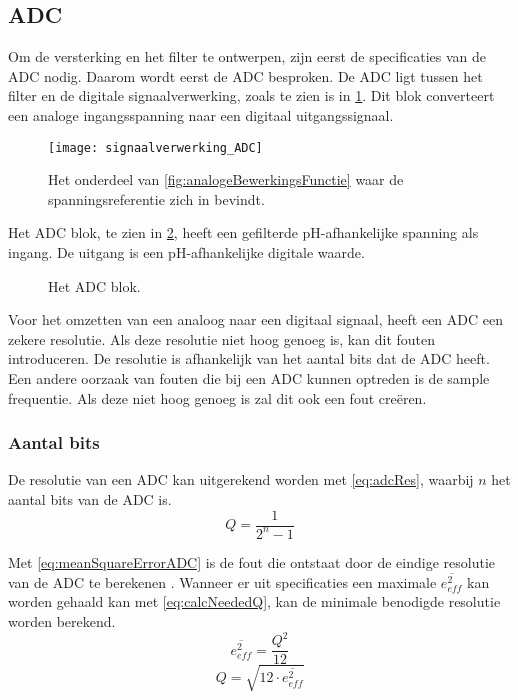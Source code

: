 \subsection{ADC}
Om de versterking en het filter te ontwerpen, zijn eerst de specificaties van de ADC nodig. Daarom wordt eerst de ADC besproken. De ADC ligt tussen het filter en de digitale signaalverwerking, zoals te zien is in \cref{fig:ADCInSchema}. Dit blok converteert een analoge ingangsspanning naar een digitaal uitgangssignaal.

\begin{figure}[!htb]
    \centering
    \texttt{[image: signaalverwerking\_ADC]}
    \caption{Het onderdeel van \cref{fig:analogeBewerkingsFunctie} waar de spanningsreferentie zich in bevindt.}
    \label{fig:ADCInSchema}
\end{figure}

Het ADC blok, te zien in \cref{fig:ADCBlok}, heeft een gefilterde pH-afhankelijke spanning als ingang. De uitgang is een pH-afhankelijke digitale waarde.

\begin{figure}[!htb]
    \centering
    \def\svgwidth{0.4\textwidth}
    
    \caption{Het ADC blok.}
    \label{fig:ADCBlok}
\end{figure}

Voor het omzetten van een analoog naar een digitaal signaal, heeft een ADC een zekere resolutie. Als deze resolutie niet hoog genoeg is, kan dit fouten introduceren. De resolutie is afhankelijk van het aantal bits dat de ADC heeft. Een andere oorzaak van fouten die bij een ADC kunnen optreden is de sample frequentie. Als deze niet hoog genoeg is zal dit ook een fout creëren.

\subsubsection{Aantal bits} \label{sec:ADC:numBits}
De resolutie van een ADC kan uitgerekend worden met \cref{eq:adcRes}, waarbij $n$ het aantal bits van de ADC is.
\begin{equation}\label{eq:adcRes}
    Q=\frac{1}{2^n-1}
\end{equation}

Met \cref{eq:meanSquareErrorADC} is de fout die ontstaat door de eindige resolutie van de ADC te berekenen \cite{MJHcalcADC}. Wanneer er uit specificaties een maximale $\overline{e_{eff}^2}$ kan worden gehaald kan met \cref{eq:calcNeededQ}, kan de minimale benodigde resolutie worden berekend.
\begin{equation}\label{eq:meanSquareErrorADC}
    \overline{e_{eff}^2}=\frac{Q^2}{12}
\end{equation}
\begin{equation}\label{eq:calcNeededQ}
    Q=\sqrt{12\cdot\overline{e_{eff}^2}}
\end{equation}

